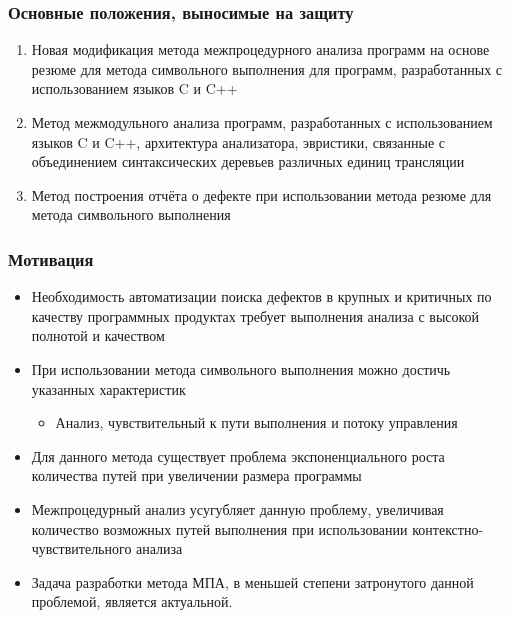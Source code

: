 \documentclass[14pt]{beamer}
\begin{document}
\begin{frame}[allowframebreaks]
\frametitle{Основные положения, выносимые на защиту}
\begin{enumerate}
  \item Новая модификация метода межпроцедурного анализа программ на основе резюме для метода символьного выполнения для программ, разработанных с использованием языков C и C++
  \item Метод межмодульного анализа программ, разработанных с использованием языков C и C++, архитектура анализатора, эвристики, связанные с объединением синтаксических деревьев различных единиц трансляции
  \item Метод построения отчёта о дефекте при использовании метода резюме для метода символьного выполнения
\end{enumerate}
\end{frame}

\begin{frame}[allowframebreaks]
\frametitle{Мотивация}
\begin{itemize}
  \item Необходимость автоматизации поиска дефектов в крупных и критичных по качеству программных продуктах требует выполнения анализа с высокой полнотой и качеством
  \item При использовании метода символьного выполнения можно достичь указанных характеристик
  \begin{itemize}
    \item Анализ, чувствительный к пути выполнения и потоку управления
  \end{itemize}

  \item Для данного метода существует проблема экспоненциального роста количества путей при увеличении размера программы
  \item Межпроцедурный анализ усугубляет данную проблему, увеличивая количество возможных путей выполнения при использовании контекстно-чувствительного анализа
  \item Задача разработки метода МПА, в меньшей степени затронутого данной проблемой, является актуальной.
\end{itemize}
\end{frame}
\end{document}
